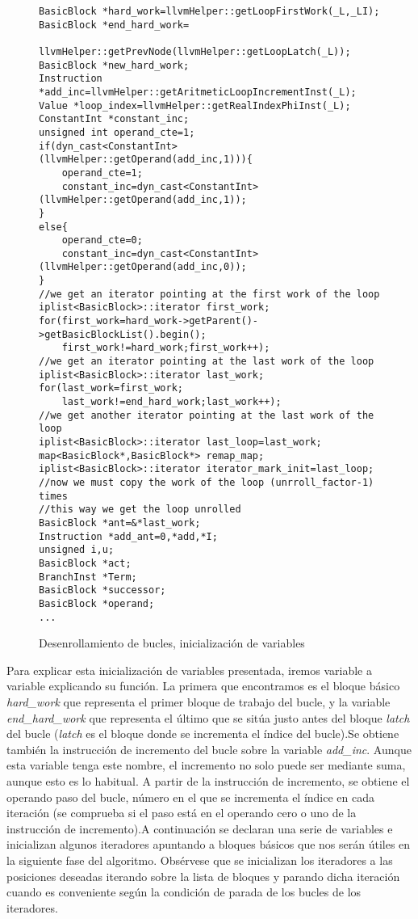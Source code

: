 \begin{figure}[tph]
\begin{lstlisting}
BasicBlock *hard_work=llvmHelper::getLoopFirstWork(_L,_LI);
BasicBlock *end_hard_work=
		llvmHelper::getPrevNode(llvmHelper::getLoopLatch(_L));
BasicBlock *new_hard_work;
Instruction *add_inc=llvmHelper::getAritmeticLoopIncrementInst(_L);
Value *loop_index=llvmHelper::getRealIndexPhiInst(_L);
ConstantInt *constant_inc;
unsigned int operand_cte=1;
if(dyn_cast<ConstantInt>(llvmHelper::getOperand(add_inc,1))){
	operand_cte=1;
	constant_inc=dyn_cast<ConstantInt>(llvmHelper::getOperand(add_inc,1));
}
else{
	operand_cte=0;
	constant_inc=dyn_cast<ConstantInt>(llvmHelper::getOperand(add_inc,0));
}
//we get an iterator pointing at the first work of the loop
iplist<BasicBlock>::iterator first_work;
for(first_work=hard_work->getParent()->getBasicBlockList().begin();
	first_work!=hard_work;first_work++);
//we get an iterator pointing at the last work of the loop
iplist<BasicBlock>::iterator last_work;
for(last_work=first_work;
	last_work!=end_hard_work;last_work++);
//we get another iterator pointing at the last work of the loop
iplist<BasicBlock>::iterator last_loop=last_work;
map<BasicBlock*,BasicBlock*> remap_map;
iplist<BasicBlock>::iterator iterator_mark_init=last_loop;
//now we must copy the work of the loop (unrroll_factor-1) times
//this way we get the loop unrolled
BasicBlock *ant=&*last_work;
Instruction *add_ant=0,*add,*I;
unsigned i,u;
BasicBlock *act;
BranchInst *Term;
BasicBlock *successor;
BasicBlock *operand;
...
\end{lstlisting}
\caption{Desenrollamiento de bucles, inicialización de variables}
\label{FIG:LoopUnrollInit}
\end{figure}

Para explicar esta inicialización de variables presentada, iremos variable a variable explicando su función. La primera que encontramos es el bloque básico \textit{hard\_work} que representa el primer bloque de trabajo del bucle, y la variable \textit{end\_hard\_work} que representa el último que se sitúa justo antes del bloque \textit{latch} del bucle (\textit{latch} es el bloque donde se incrementa el índice del bucle).Se obtiene también la instrucción de incremento del bucle sobre la variable \textit{add\_inc}. Aunque esta variable tenga este nombre, el incremento no solo puede ser mediante suma, aunque esto es lo habitual. A partir de la instrucción de incremento, se obtiene el operando paso del bucle, número en el que se incrementa el índice en cada iteración (se comprueba si el paso está en el operando cero o uno de la instrucción de incremento).A continuación se declaran una serie de variables e inicializan algunos iteradores apuntando a bloques básicos que nos serán útiles en la siguiente fase del algoritmo. Obsérvese que se inicializan los iteradores a las posiciones deseadas iterando sobre la lista de bloques y parando dicha iteración cuando es conveniente según la condición de parada de los bucles de los iteradores.


